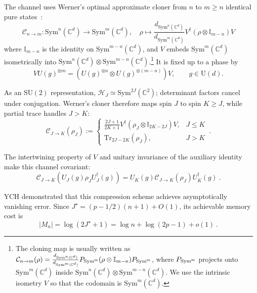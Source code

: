 \documentclass[a4paper,onecolumn,11pt]{quantumarticle}
\def\h{\mathcal{H}}
\def\id{\mathbb{I}}
\newcommand*{\Tr}{\mathrm{Tr}}
\begin{document}
The channel uses Werner's optimal approximate cloner from $n$ to
$m\ge n$ identical pure states~\cite{werner1998optimal}:
\begin{equation}\label{eq:werner}
    \mathcal{C}_{n \to m}:\mathrm{Sym}^n(\mathbb{C}^d)\to\mathrm{Sym}^m(\mathbb{C}^d),\quad \rho\mapsto \frac{d_{\mathrm{Sym}^n(\mathbb{C}^d)}}{d_{\mathrm{Sym}^m(\mathbb{C}^d)}}V^\dagger(\rho\otimes \id_{m-n})V
\end{equation}
where $\id_{m-n}$ is the identity on $\mathrm{Sym}^{m-n}(\mathbb{C}^d)$, and $V$ embeds $\mathrm{Sym}^m(\mathbb{C}^d)$ isometrically into $\mathrm{Sym}^n(\mathbb{C}^d)\otimes \mathrm{Sym}^{m-n}(\mathbb{C}^d)$.\footnote{The cloning map is usually written as $\mathcal{C}_{n \to m}(\rho) = \frac{d_{\mathrm{Sym}^n(\mathbb{C}^d)}}{d_{\mathrm{Sym}^m(\mathbb{C}^d)}}P_{\rm{Sym}^m}(\rho\otimes \id_{m-n})P_{\rm{Sym}^m}$, where $P_{\rm{Sym}^m}$ projects onto $\mathrm{Sym}^m(\mathbb{C}^d)$ inside $\mathrm{Sym}^n(\mathbb{C}^d)\otimes \mathrm{Sym}^{m-n}(\mathbb{C}^d)$. We use the intrinsic isometry $V$ so that the codomain is $\mathrm{Sym}^m(\mathbb{C}^d)$.} It is fixed up to a phase by
\begin{equation}
V U(g)^{\otimes m}
=(U(g)^{\otimes n}\otimes U(g)^{\otimes(m-n)})V,
\qquad g\in\mathrm U(d).
\end{equation}

As an $\mathrm{SU}(2)$ representation,
$\h_J\simeq\mathrm{Sym}^{2J}(\mathbb C^2)$; determinant factors
cancel under conjugation. Werner's cloner therefore maps spin $J$
to spin $K\ge J$, while partial trace handles $J>K$:
\begin{equation}\label{eq:qubitcloning}
    \mathcal{C}_{J\to K}(\rho_J) :=  \begin{cases} 
        \frac{2J+1}{2K+1} V^\dagger(\rho_J \otimes \id_{2K-2J})V, & J \le K \\ 
        \Tr_{2J-2K}(\rho_J), & J > K
    \end{cases}\ .
\end{equation}

The intertwining property of $V$ and unitary invariance of the
auxiliary identity make this channel covariant:
\begin{equation}
    \mathcal{C}_{J\to K}\left(U_J(g) \rho_J U_J^\dagger(g)\right) = U_K(g) \mathcal{C}_{J\to K}(\rho_J) U_K^\dagger(g)\ .
\end{equation}

YCH demonstrated that this compression scheme achieves asymptotically vanishing error. Since $J^\star=(p-1/2)(n+1)+O(1)$, its achievable memory cost is
\begin{equation}\label{eq:achievable_qubit}
    |M_n|=\log (2J^\star+1) = \log n + \log (2p-1) + o(1)\ .
\end{equation}
\end{document}
